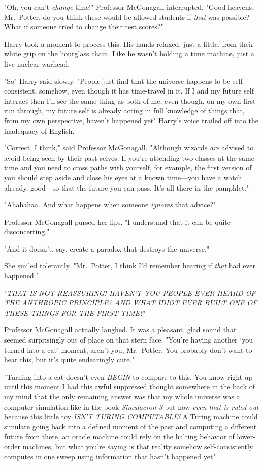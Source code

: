 "Oh, you can't \emph{change} time!" Professor McGonagall interrupted. "Good
heavens, Mr.~Potter, do you think these would be allowed students if
\emph{that} was possible? What if someone tried to change their test scores?"

Harry took a moment to process this. His hands relaxed, just a little, from
their white grip on the hourglass chain. Like he wasn't holding a time machine,
just a live nuclear warhead.

"So{\el}" Harry said slowly. "People just find that the universe{\el}
happens to be self-consistent, somehow, even though it has time-travel in it.
If I and my future self interact then I'll see the same thing as both of me,
even though, on my own first run through, my future self is already acting in
full knowledge of things that, from my own perspective, haven't happened
yet{\el}" Harry's voice trailed off into the inadequacy of English.

"Correct, I think," said Professor McGonagall. "Although wizards \emph{are}
advised to avoid being seen by their past selves. If you're attending two
classes at the same time and you need to cross paths with yourself, for
example, the first version of you should step aside and close his eyes at a
known time—you have a watch already, good—so that the future you can pass.
It's all there in the pamphlet."

"Ahahahaa. And what happens when someone \emph{ignores} that advice?"

Professor McGonagall pursed her lips. "I understand that it can be quite
disconcerting."

"And it doesn't, say, create a paradox that destroys the universe."

She smiled tolerantly. "Mr.~Potter, I think I'd remember hearing if \emph{that}
had ever happened."

"\emph{THAT IS NOT REASSURING! HAVEN'T YOU PEOPLE EVER HEARD OF THE ANTHROPIC
PRINCIPLE? AND WHAT IDIOT EVER BUILT ONE OF THESE THINGS FOR THE FIRST TIME?}"

Professor McGonagall actually laughed. It was a pleasant, glad sound that
seemed surprisingly out of place on that stern face. "You're having another
`you turned into a cat' moment, aren't you, Mr.~Potter. You probably don't want
to hear this, but it's quite endearingly cute."

"Turning into a cat doesn't even \emph{BEGIN} to compare to this. You know
right up until this moment I had this awful suppressed thought somewhere in the
back of my mind that the only remaining answer was that my whole universe was a
computer simulation like in the book \emph{Simulacron 3} but now \emph{even
that is ruled out} because this little toy \emph{ISN'T TURING COMPUTABLE!} A
Turing machine could simulate going back into a defined moment of the past and
computing a different future from there, an oracle machine could rely on the
halting behavior of lower-order machines, but what you're saying is that
reality somehow self-consistently computes in one sweep using information that
hasn't{\el} happened{\el} yet{\el}"


